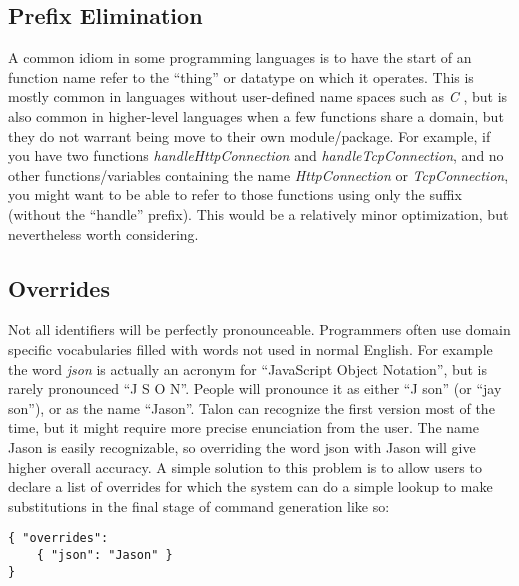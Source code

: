 \documentclass[../thesis.tex]{subfiles}
\begin{document}
\subsection{Prefix Elimination}
A common idiom in some programming languages is to have the start of an function name refer to the ``thing''
or datatype on which it operates. This is mostly common in languages without user-defined name spaces such as \textit{C}
, but is also common in higher-level languages when a few functions share a domain, but they do not warrant
being move to their own module/package.
For example, if you have two functions \textit{handleHttpConnection} and \textit{handleTcpConnection}, and no other
functions/variables containing the name \textit{HttpConnection} or \textit{TcpConnection}, you might want to
be able to refer to those functions using only the suffix (without the ``handle'' prefix).
This would be a relatively minor optimization, but nevertheless worth considering.

\subsection{Overrides}\label{overrides}
Not all identifiers will be perfectly pronounceable.
Programmers often use domain specific vocabularies filled with words not used in normal English.
For example the word \textit{json} is actually an acronym for ``JavaScript Object Notation'', but is rarely
pronounced ``J S O N''.
People will pronounce it as either ``J son'' (or ``jay son''), or as the name ``Jason''.
Talon can recognize the first version most of the time, but it might require more precise enunciation from the user.
The name Jason is easily recognizable, so overriding the word json with Jason will give higher overall accuracy.
A simple solution to this problem is to allow users to declare a list of overrides for which the system
can do a simple lookup to make substitutions in the final stage of command generation like so:
\begin{verbatim}
{ "overrides": 
    { "json": "Jason" }
} 
\end{verbatim}



\end{document}
